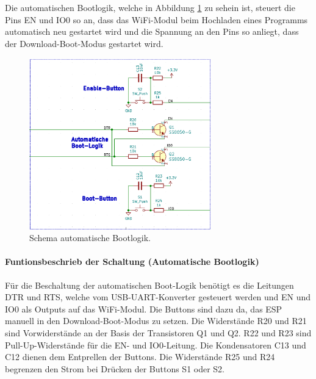 Die automatischen Bootlogik, welche in Abbildung \ref{fig:Schema_ESP32_Flashbuttons} zu sehein ist, steuert die Pins EN und IO0 so an, dass das WiFi-Modul beim Hochladen eines Programms automatisch neu gestartet wird und die Spannung an den Pins so anliegt, dass der Download-Boot-Modus gestartet wird.

\begin{figure}[H]
	\centering
	\includegraphics[width=0.7\textwidth]{graphics/Schema_ESP32_Flashbuttons}
	\caption{Schema automatische Bootlogik.}
	\label{fig:Schema_ESP32_Flashbuttons}
\end{figure}

\paragraph{Funtionsbeschrieb der Schaltung (Automatische Bootlogik)}\mbox{}

Für die Beschaltung der automatischen Boot-Logik benötigt es die Leitungen DTR und RTS, welche vom USB-UART-Konverter gesteuert werden und EN und IO0 als Outputs auf das WiFi-Modul. Die Buttons sind dazu da, das ESP manuell in den Download-Boot-Modus zu setzen.
Die Widerstände R20 und R21 sind Vorwiderstände an der Basis der Transistoren Q1 und Q2. R22 und R23 sind Pull-Up-Widerstände für die EN- und IO0-Leitung. Die Kondensatoren C13 und C12 dienen dem Entprellen der Buttons. Die Widerstände R25 und R24 begrenzen den Strom bei Drücken der Buttons S1 oder S2.
